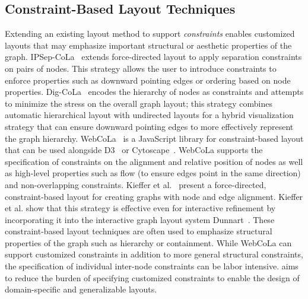 \subsection{Constraint-Based Layout Techniques}
Extending an existing layout method to support \emph{constraints} enables 
customized layouts that may emphasize important
structural or aesthetic properties of the graph. IPSep-CoLa~\cite{dwyer2006ipsep} extends
force-directed layout to apply separation constraints on pairs of nodes.
This strategy allows the user to introduce constraints to enforce properties 
such as downward pointing edges or ordering based on node properties.
Dig-CoLa~\cite{dwyer2005dig} encodes the hierarchy of nodes as constraints
and attempts to minimize the stress on the overall graph layout; this strategy
combines automatic hierarchical layout with undirected layouts for a hybrid
visualization strategy that can ensure downward pointing edges to more
effectively represent the graph hierarchy. 
WebCoLa~\cite{WebCoLa} is a JavaScript library for constraint-based layout 
that can be used alongside D3~\cite{bostock:d3} or Cytoscape~\cite{shannon2003cytoscape}.
WebCoLa supports the specification of constraints on the alignment and relative
position of nodes as well as high-level properties such as flow (to ensure
edges point in the same direction) and non-overlapping constraints.
Kieffer et al.~\cite{kieffer2013incremental} present a force-directed,
constraint-based layout for creating graphs with node and edge alignment.
Kieffer et al. show that this strategy is effective even for interactive refinement 
by incorporating it into the interactive graph layout system Dunnart~\cite{dwyer2008dunnart}. 
These constraint-based layout techniques are often used to emphasize structural properties of
the graph such as hierarchy or containment. While WebCoLa can support 
customized constraints in addition to more general structural constraints,
the specification of individual inter-node constraints can be labor intensive.
\projectname aims to reduce the burden of specifying customized constraints
to enable the design of domain-specific and generalizable layouts.

